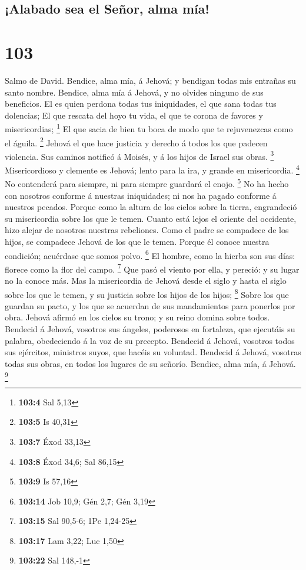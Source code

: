 \hypertarget{alabado-sea-el-seuxf1or-alma-muxeda}{%
\subsection{¡Alabado sea el Señor, alma
mía!}\label{alabado-sea-el-seuxf1or-alma-muxeda}}

\hypertarget{section-102}{%
\section{103}\label{section-102}}

 Salmo de David. Bendice, alma mía, á Jehová; y bendigan
todas mis entrañas su santo nombre.  Bendice, alma mía á
Jehová, y no olvides ninguno de sus beneficios.  El es quien
perdona todas tus iniquidades, el que sana todas tus dolencias;
 El que rescata del hoyo tu vida, el que te corona de
favores y misericordias; \footnote{\textbf{103:4} Sal 5,13} 
El que sacia de bien tu boca de modo que te rejuvenezcas como el águila.
\footnote{\textbf{103:5} Is 40,31}  Jehová el que hace
justicia y derecho á todos los que padecen violencia.  Sus
caminos notificó á Moisés, y á los hijos de Israel sus obras.
\footnote{\textbf{103:7} Éxod 33,13}  Misericordioso y
clemente es Jehová; lento para la ira, y grande en misericordia.
\footnote{\textbf{103:8} Éxod 34,6; Sal 86,15}  No
contenderá para siempre, ni para siempre guardará el enojo. \footnote{\textbf{103:9}
  Is 57,16}  No ha hecho con nosotros conforme á nuestras
iniquidades; ni nos ha pagado conforme á nuestros pecados. 
Porque como la altura de los cielos sobre la tierra, engrandeció su
misericordia sobre los que le temen.  Cuanto está lejos el
oriente del occidente, hizo alejar de nosotros nuestras rebeliones.
 Como el padre se compadece de los hijos, se compadece
Jehová de los que le temen.  Porque él conoce nuestra
condición; acuérdase que somos polvo. \footnote{\textbf{103:14} Job
  10,9; Gén 2,7; Gén 3,19}  El hombre, como la hierba son
sus días: florece como la flor del campo. \footnote{\textbf{103:15} Sal
  90,5-6; 1Pe 1,24-25}  Que pasó el viento por ella, y
pereció: y su lugar no la conoce más.  Mas la misericordia
de Jehová desde el siglo y hasta el siglo sobre los que le temen, y su
justicia sobre los hijos de los hijos; \footnote{\textbf{103:17} Lam
  3,22; Luc 1,50}  Sobre los que guardan su pacto, y los
que se acuerdan de sus mandamientos para ponerlos por obra.
 Jehová afirmó en los cielos su trono; y su reino domina
sobre todos.  Bendecid á Jehová, vosotros sus ángeles,
poderosos en fortaleza, que ejecutáis su palabra, obedeciendo á la voz
de su precepto.  Bendecid á Jehová, vosotros todos sus
ejércitos, ministros suyos, que hacéis su voluntad. 
Bendecid á Jehová, vosotras todas sus obras, en todos los lugares de su
señorío. Bendice, alma mía, á Jehová. \footnote{\textbf{103:22} Sal
  148,-1}

